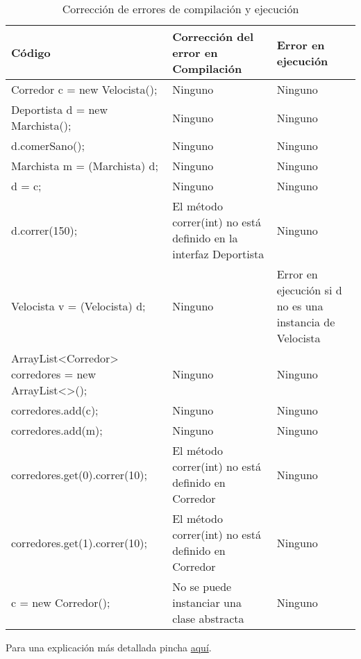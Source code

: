 \documentclass[a4paper,12pt]{article}
\begin{document}
\begin{table}[H]
    \centering
    \begin{tabular}{|p{7cm}|p{5cm}|p{3cm}|}
        \hline
        \textbf{Código} & \textbf{Corrección del error en Compilación} & \textbf{Error en ejecución} \\ \hline
        Corredor c = new Velocista(); & Ninguno & Ninguno \\ \hline
        Deportista d = new Marchista(); & Ninguno & Ninguno \\ \hline
        d.comerSano(); & Ninguno & Ninguno \\ \hline
        Marchista m = (Marchista) d; & Ninguno & Ninguno \\ \hline
        d = c; & Ninguno & Ninguno \\ \hline
        d.correr(150); & El método correr(int) no está definido en la interfaz Deportista & Ninguno \\ \hline
        Velocista v = (Velocista) d; & Ninguno & Error en ejecución si d no es una instancia de Velocista \\ \hline
        ArrayList<Corredor> corredores = new ArrayList<>(); & Ninguno & Ninguno \\ \hline
        corredores.add(c); & Ninguno & Ninguno \\ \hline
        corredores.add(m); & Ninguno & Ninguno \\ \hline
        corredores.get(0).correr(10); & El método correr(int) no está definido en Corredor & Ninguno \\ \hline
        corredores.get(1).correr(10); & El método correr(int) no está definido en Corredor & Ninguno \\ \hline
        c = new Corredor(); & No se puede instanciar una clase abstracta & Ninguno \\ \hline
    \end{tabular}
    \caption{Corrección de errores de compilación y ejecución}
\end{table}

Para una explicación más detallada pincha \href{https://github.com/ElblogdeIsmael/ElblogdeIsmael.github.io/tree/main/Asignaturas/Tercer%20A%C3%B1o/PDOO/Teoria/RelacionesEjercicios/Solt3/ETSIIT/explicacion_ej14.md}{aquí}.
\end{document}
